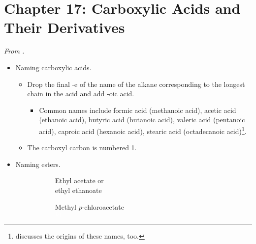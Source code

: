 \documentclass[../notes.tex]{subfiles}
\begin{document}
\section{Chapter 17: Carboxylic Acids and Their Derivatives}
\emph{From \textcite{bib:SolomonsEtAl}.}
\begin{itemize}
    \item Naming carboxylic acids.
    \begin{itemize}
        \item Drop the final -e of the name of the alkane corresponding to the longest chain in the acid and add -oic acid.
        \begin{itemize}
            \item Common names include formic acid (methanoic acid), acetic acid (ethanoic acid), butyric acid (butanoic acid), valeric acid (pentanoic acid), caproic acid (hexanoic acid), stearic acid (octadecanoic acid)\footnote{\textcite{bib:SolomonsEtAl} discusses the origins of these names, too.}.
        \end{itemize}
        \item The carboxyl carbon is numbered 1.
    \end{itemize}
    \item Naming esters.
    \begin{figure}[h!]
        \centering
        \footnotesize
        \captionsetup{justification=centering}
        \begin{subfigure}[b]{0.3\linewidth}
            \centering
            \color{blx}
            \caption*{\textcolor{rex}{Ethyl} \textcolor{blx}{acetate} or\\\textcolor{rex}{ethyl} \textcolor{blx}{ethanoate}}
            \label{fig:esterNomenclaturea}
        \end{subfigure}
        \begin{subfigure}[b]{0.3\linewidth}
            \centering
            \color{blx}
            \caption*{\textcolor{rex}{Methyl} \textcolor{grx}{$p$-chloro}\textcolor{blx}{acetate}\\${\color{white}hi}$}
            \label{fig:esterNomenclatureb}
        \end{subfigure}
        \begin{subfigure}[b]{0.3\linewidth}
            \centering
            \color{blx}

\end{subfigure}
\end{figure}
\end{itemize}
\end{document}

